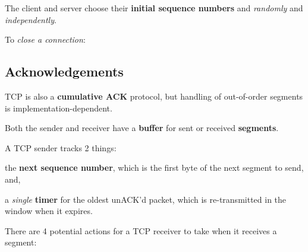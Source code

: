 \begin{enumerate*}
\end{enumerate*}

The client and server choose their \textbf{initial sequence numbers}  and 
\textit{randomly} and \textit{independently}.

To \textit{close a connection}:
\begin{enumerate*}
\end{enumerate*}

\subsection{Acknowledgements}
TCP is also a \textbf{cumulative ACK} protocol, but handling of out-of-order segments
is implementation-dependent.

Both the sender and receiver have a \textbf{buffer} for sent or received \textbf{segments}.

A TCP sender tracks 2 things:
\begin{enumerate*}
    \item the \textbf{next sequence number}, which is the first byte of the next segment to send, and,
    \item a \textit{single} \textbf{timer} for the oldest unACK'd packet, which is re-transmitted in the window when it expires.
\end{enumerate*}

There are 4 potential actions for a TCP receiver to take when it receives a segment:
\begin{enumerate*}
\end{enumerate*}

